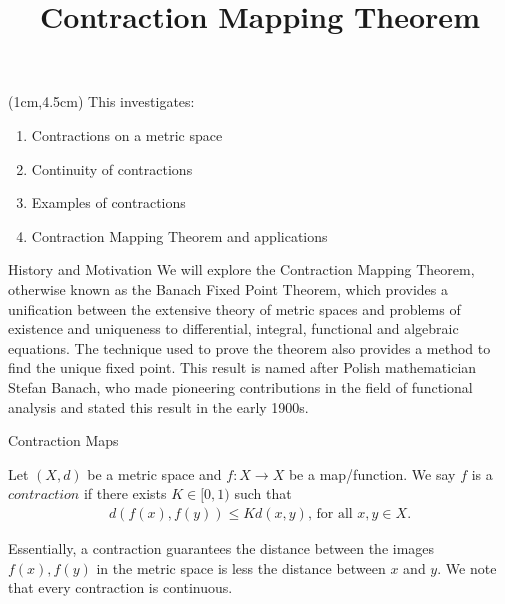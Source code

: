 \documentclass{beamer}
\title{Contraction Mapping Theorem}
\author{}
\date{}
\begin{document}
\begin{frame}
    \titlepage 
    
    
\begin{textblock*}{10cm}(1cm,4.5cm)
This investigates:
\begin{enumerate}
        \item Contractions on a metric space
        \item Continuity of contractions
        \item Examples of contractions
        \item Contraction Mapping Theorem and applications
    \end{enumerate}
\end{textblock*}    
\end{frame}

\logo{}


\begin{frame}{History and Motivation}
We will explore the Contraction Mapping Theorem, otherwise known as the Banach Fixed Point Theorem, which provides a unification between the extensive theory of metric spaces and problems of existence and uniqueness to differential, integral, functional and algebraic equations. The technique used to prove the theorem also provides a method to find the unique fixed point. This result is named after Polish mathematician Stefan Banach, who made pioneering contributions in the field of functional analysis and stated this result in the early 1900s.
\end{frame}



\begin{frame}{Contraction Maps}
\begin{definition}
Let $(X,d)$ be a metric space and $f:X\to X$ be a map/function. We say $f$ is a $contraction$ if there exists $K\in[0,1)$ such that 
\begin{align}
d(f(x),f(y))\leq Kd(x,y)\text{, for all } x,y\in X.\label{eq:defn}\tag{*}
\end{align}
\end{definition}
Essentially, a contraction guarantees the distance between the images $f(x),f(y)$ in the metric space is less the distance between $x$ and $y$. \newline
We note that every contraction is continuous. 
\end{frame}
    
\end{document}
